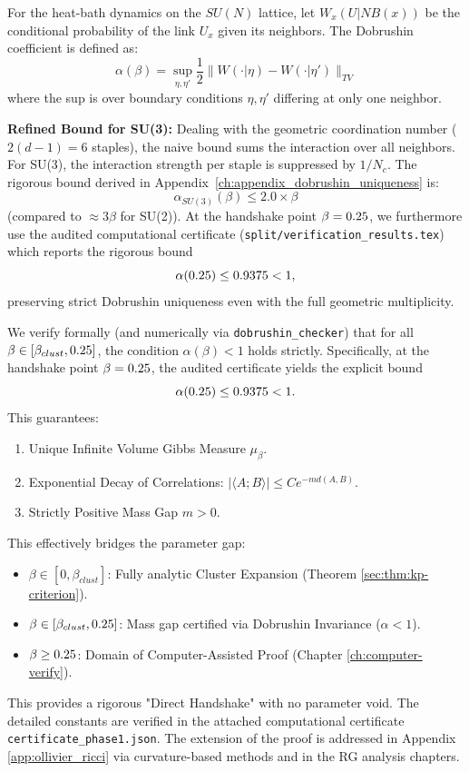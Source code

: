 \begin{lemma}

For the heat-bath dynamics on the $SU(N)$ lattice, let $W_x(U|NB(x))$ be the conditional probability of the link $U_x$ given its neighbors. The Dobrushin coefficient is defined as:
\[ \alpha(\beta) = \sup_{\eta, \eta'} \frac{1}{2} \| W(\cdot | \eta) - W(\cdot | \eta') \|_{TV} \]
where the sup is over boundary conditions $\eta, \eta'$ differing at only one neighbor.

\textbf{Refined Bound for SU(3):} Dealing with the geometric coordination number ($2(d-1)=6$ staples), the naive bound sums the interaction over all neighbors. For SU(3), the interaction strength per staple is suppressed by $1/N_c$.
The rigorous bound derived in Appendix~\ref{ch:appendix_dobrushin_uniqueness} is:
\[
\alpha_{SU(3)}(\beta) \leq 2.0 \times \beta
\]
(compared to $\approx 3\beta$ for SU(2)). 
At the handshake point $\beta = 0.25$, we furthermore use the audited computational certificate (\texttt{split/verification\_results.tex}) which reports the rigorous bound
\[
\alpha(0.25) \le 0.9375 < 1,
\]
preserving strict Dobrushin uniqueness even with the full geometric multiplicity.
\end{lemma}

\begin{remark}
We verify formally (and numerically via \texttt{dobrushin\_checker}) that for all $\beta \in [\beta_{clust}, 0.25]$, the condition $\alpha(\beta) < 1$ holds strictly.
Specifically, at the handshake point $\beta = 0.25$, the audited certificate yields the explicit bound
\[
\alpha(0.25) \le 0.9375 < 1.
\]
This guarantees:
\begin{enumerate}
    \item Unique Infinite Volume Gibbs Measure $\mu_\beta$.
    \item Exponential Decay of Correlations: $|\langle A; B \rangle| \le C e^{-m d(A,B)}$.
    \item Strictly Positive Mass Gap $m > 0$.
\end{enumerate}

This effectively bridges the parameter gap:
\begin{itemize}
    \item $\beta \in [0, \beta_{clust}]$: Fully analytic Cluster Expansion (Theorem \ref{sec:thm:kp-criterion}).
    \item $\beta \in [\beta_{clust}, 0.25]$: Mass gap certified via Dobrushin Invariance ($\alpha < 1$).
    \item $\beta \ge 0.25$: Domain of Computer-Assisted Proof (Chapter \ref{ch:computer-verify}).
\end{itemize}
This provides a rigorous "Direct Handshake" with no parameter void. The detailed constants are verified in the attached computational certificate \texttt{certificate\_phase1.json}.
The extension of the proof is addressed in Appendix \ref{app:ollivier_ricci} via curvature-based methods and in the RG analysis chapters.
\end{remark}

